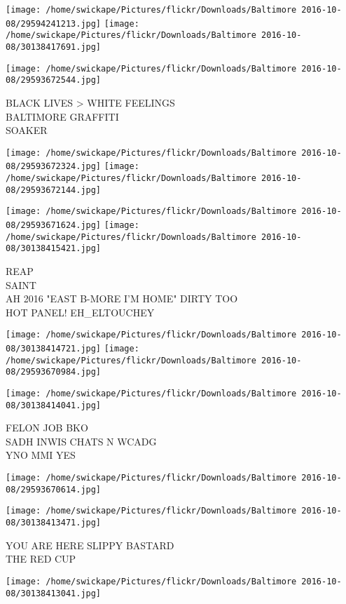 \documentclass[10pt,letterpaper]{article}
\begin{document}
\texttt{[image: /home/swickape/Pictures/flickr/Downloads/Baltimore 2016-10-08/29594241213.jpg]}
\texttt{[image: /home/swickape/Pictures/flickr/Downloads/Baltimore 2016-10-08/30138417691.jpg]}

\vspace{0.25in}
\texttt{[image: /home/swickape/Pictures/flickr/Downloads/Baltimore 2016-10-08/29593672544.jpg]}

BLACK LIVES > WHITE FEELINGS\\
BALTIMORE GRAFFITI\\
SOAKER
\pagebreak

\texttt{[image: /home/swickape/Pictures/flickr/Downloads/Baltimore 2016-10-08/29593672324.jpg]}
\texttt{[image: /home/swickape/Pictures/flickr/Downloads/Baltimore 2016-10-08/29593672144.jpg]}

\texttt{[image: /home/swickape/Pictures/flickr/Downloads/Baltimore 2016-10-08/29593671624.jpg]}
\texttt{[image: /home/swickape/Pictures/flickr/Downloads/Baltimore 2016-10-08/30138415421.jpg]}

REAP\\
SAINT\\
AH 2016 "EAST B{-}MORE I'M HOME"  DIRTY TOO\\
HOT PANEL! EH\_ELTOUCHEY
\pagebreak

\texttt{[image: /home/swickape/Pictures/flickr/Downloads/Baltimore 2016-10-08/30138414721.jpg]}
\texttt{[image: /home/swickape/Pictures/flickr/Downloads/Baltimore 2016-10-08/29593670984.jpg]}

\texttt{[image: /home/swickape/Pictures/flickr/Downloads/Baltimore 2016-10-08/30138414041.jpg]}

FELON JOB BKO\\
SADH INWIS CHATS N WCADG\\
YNO MMI YES
\pagebreak

\texttt{[image: /home/swickape/Pictures/flickr/Downloads/Baltimore 2016-10-08/29593670614.jpg]}

\vspace{0.25in}
\texttt{[image: /home/swickape/Pictures/flickr/Downloads/Baltimore 2016-10-08/30138413471.jpg]}

YOU ARE HERE SLIPPY BASTARD\\
THE RED CUP
\pagebreak

\texttt{[image: /home/swickape/Pictures/flickr/Downloads/Baltimore 2016-10-08/30138413041.jpg]}
\end{document}
